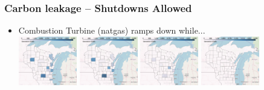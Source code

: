 \documentclass[xcolor=dvipsnames]{beamer}
\begin{document}
\begin{frame}
  \frametitle{Carbon leakage -- Shutdowns Allowed}
\begin{itemize}


  \item Combustion Turbine (natgas) ramps down while... \\
  \includegraphics[width=0.2\textwidth]{includes/no_leakage_shutdowns_CT_r0.png}
  \includegraphics[width=0.2\textwidth]{includes/no_leakage_shutdowns_CT_r2.png}
  \includegraphics[width=0.2\textwidth]{includes/no_leakage_shutdowns_CT_r3.png}
  \includegraphics[width=0.2\textwidth]{includes/no_leakage_shutdowns_CT_r4.png}




\end{itemize}
\end{frame}
\end{document}

